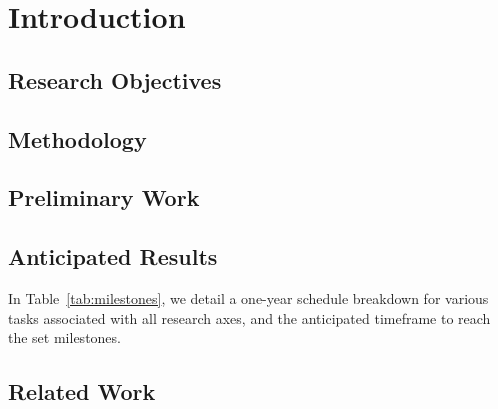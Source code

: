 \section{Introduction}


\subsection{Research Objectives}


\subsection{Methodology}


\subsection{Preliminary Work}


\subsection{Anticipated Results}
In Table~\ref{tab:milestones}, we detail a one-year schedule breakdown for various tasks associated with all research axes, and the anticipated timeframe to reach the set milestones.


\subsection{Related Work}




